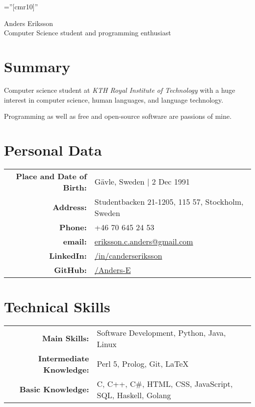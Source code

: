 \documentclass[a4paper,10pt]{article}
\begin{document}
\pagestyle{empty} %

\font\fb=''[cmr10]'' %

\par{
    \centering
	{
	    \Huge \bitter Anders Eriksson \\
	    \normalfont
	    \normalsize Computer Science student and programming enthusiast
	}
	\bigskip\par
}

\section{Summary}
Computer science student at \emph{KTH Royal Institute of Technology} with a huge interest in computer science, human languages, and language technology.

Programming as well as free and open-source software are passions of mine.

\section{Personal Data}

\begin{tabular}{rl}
    \textbf{Place and Date of Birth:} & G{\"a}vle, Sweden  | 2 Dec 1991 \\
    \textbf{Address:}   & Studentbacken 21-1205, 115 57, Stockholm, Sweden \\
    \textbf{Phone:}     & +46 70 645 24 53\\
    \textbf{email:}     & \href{mailto:eriksson.c.anders@gmail.com
}{eriksson.c.anders@gmail.com}\\
    \textbf{LinkedIn:}	& \href{http://se.linkedin.com/in/canderseriksson}{/in/canderseriksson}\\
    \textbf{GitHub:}	& \href{http://github.com/Anders-E}{/Anders-E}
\end{tabular}

\section{Technical Skills}
\begin{tabular}{rl}
\textbf{Main Skills:}& Software Development, Python, Java, Linux \\
\textbf{Intermediate Knowledge:}& Perl 5, Prolog, Git, \LaTeX\\
\textbf{Basic Knowledge:}& C, C++, C\#, HTML, CSS, JavaScript, SQL, Haskell, Golang \\
\end{tabular}
\end{document}
